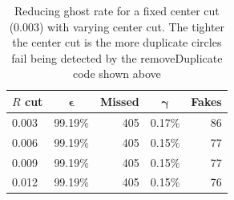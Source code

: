 \documentclass[11pt]{scrreprt}
\begin{document}
\begin{table}[htbp]
  \caption{Reducing ghost rate for a fixed center cut (0.003) with varying center cut. The tighter the center cut is
  the more duplicate circles fail being detected by the removeDuplicate code shown above}
  \label{tab:cut_variation_2}
  \centering

  \begin{tabular}{lcrcr}
  \toprule
  \textbf{$R$ cut} & $\boldsymbol{\epsilon}$ & \textbf{Missed} & $\boldsymbol{\gamma}$ & \textbf{Fakes} \\
  \midrule
  0.003 & 99.19\% & 405 & 0.17\% & 86 \\
  0.006 & 99.19\% & 405 & 0.15\% & 77 \\
  0.009 & 99.19\% & 405 & 0.15\% & 77 \\
  0.012 & 99.19\% & 405 & 0.15\% & 76 \\
  \bottomrule
  \end{tabular}
\end{table}
\end{document}
